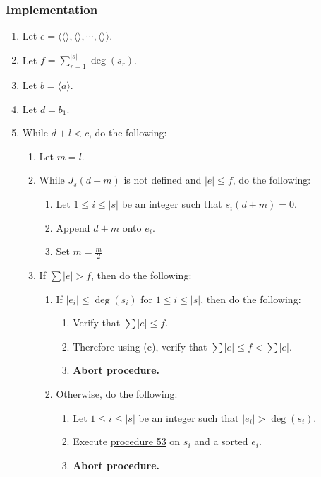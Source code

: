 \documentclass[twocolumn]{article}
\begin{document}
			\subsubsection{Implementation}
				\begin{enumerate}
					\item Let $e=\langle\langle\rangle,\langle\rangle,\cdots,\langle\rangle\rangle$.
					\item Let $f=\sum_{r=1}^{\lvert s\rvert}\deg(s_r)$.
					\item Let $b=\langle a\rangle$.
					\item Let $d=b_1$.
					\item While $d+l<c$, do the following:
					\begin{enumerate}
						\item Let $m=l$.
						\item While $J_s(d+m)$ is not defined and $\lvert e\rvert\le f$, do the following:
						\begin{enumerate}
							\item Let $1\le i\le\lvert s\rvert$ be an integer such that $s_i(d+m)=0$.
							\item Append $d+m$ onto $e_i$.
							\item Set $m=\frac{m}{2}$
						\end{enumerate}
						\item If $\sum\lvert e\rvert>f$, then do the following:
						\begin{enumerate}
							\item If $\lvert e_i\rvert\le\deg(s_i)$ for $1\le i\le\lvert s\rvert$, then do the following:
							\begin{enumerate}
								\item Verify that $\sum\lvert e\rvert\le f$.
								\item Therefore using (c), verify that $\sum\lvert e\rvert\le f<\sum\lvert e\rvert$.
								\item \textbf{Abort procedure.}
							\end{enumerate}
							\item Otherwise, do the following:
							\begin{enumerate}
								\item Let $1\le i\le\lvert s\rvert$ be an integer such that $\lvert e_i\rvert>\deg(s_i)$.
								\item Execute \hyperref[sec:procedure 53]{procedure 53} on $s_i$ and a sorted $e_i$.
								\item \textbf{Abort procedure.}
							\end{enumerate}

\end{enumerate}
\end{enumerate}
\end{enumerate}
\end{document}
